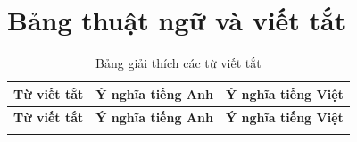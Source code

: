\chapter*{Bảng thuật ngữ và viết tắt}
\label{glossary}

\renewcommand{\thetable}{\arabic{table}}
\setcounter{table}{0}

\renewcommand{\arraystretch}{1.3}

\setlength{\LTpost}{0pt}
\setlength{\LTpre}{0pt}

\begin{center}
\begin{longtable}{|p{2.4cm}|p{5.4cm}|p{5.4cm}|}
\caption{Bảng giải thích các từ viết tắt} \label{tab:abbr} \\
\hline
\textbf{Từ viết tắt} & \textbf{Ý nghĩa tiếng Anh} & \textbf{Ý nghĩa tiếng Việt} \\
\hline
\endfirsthead

\hline
\textbf{Từ viết tắt} & \textbf{Ý nghĩa tiếng Anh} & \textbf{Ý nghĩa tiếng Việt} \\
\hline
\endhead

\hline
\endfoot

\hline
\endlastfoot


\end{longtable}
\end{center}
